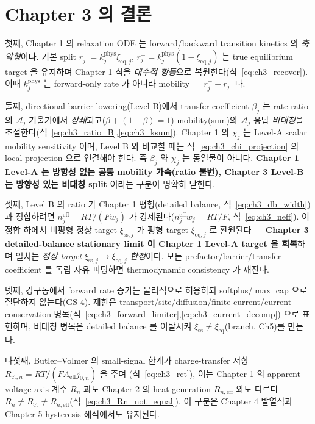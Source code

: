\documentclass[11pt,a4paper]{article}
\newcommand{\eff}{\mathrm{eff}}
\newcommand{\eq}{\mathrm{eq}}
\newcommand{\ct}{\mathrm{ct}}
\newcommand{\sstat}{\mathrm{ss}}
\begin{document}
\section{Chapter 3 의 결론}\label{sec:ch3_concl}
첫째, Chapter 1 의 relaxation ODE 는 forward/backward transition kinetics 의 \emph{축약형}이다. 기본 split
$r_j^+=k_j^{\mathrm{phys}}\xi_{\eq,j}$, $r_j^-=k_j^{\mathrm{phys}}(1-\xi_{\eq,j})$ 는 true equilibrium target 을
유지하며 Chapter 1 식을 \emph{대수적 항등}으로 복원한다(식~\eqref{eq:ch3_recover}). 이때 $k_j^{\mathrm{phys}}$ 는
forward-only rate 가 아니라 mobility $=r_j^++r_j^-$ 다.

둘째, directional barrier lowering(Level B)에서 transfer coefficient $\beta_j$ 는 rate ratio 의
$\mathcal A_j$-기울기에서 \emph{상쇄}되고($\beta+(1-\beta)=1$) mobility(sum)의 $\mathcal A_j$-응답 \emph{비대칭}을
조절한다(식~\eqref{eq:ch3_ratio_B},\allowbreak\eqref{eq:ch3_ksum}). Chapter 1 의 $\chi_j$ 는 Level-A scalar
mobility sensitivity 이며, Level B 와 비교할 때는 식~\eqref{eq:ch3_chi_projection} 의 local projection 으로
연결해야 한다. 즉 $\beta_j$ 와 $\chi_j$ 는 동일물이 아니다. \textbf{Chapter 1 Level-A 는 방향성 없는 공통 mobility
가속(ratio 불변), Chapter 3 Level-B 는 방향성 있는 비대칭 split} 이라는 구분이 명확히 닫힌다.

셋째, Level B 의 ratio 가 Chapter 1 평형(detailed balance, 식~\eqref{eq:ch3_db_width})과 정합하려면
$n_j^{\eff}=RT/(Fw_j)$ 가 강제된다($n_j^{\eff}w_j=RT/F$, 식~\eqref{eq:ch3_neff}). 이 정합 하에서 비평형 정상 target
$\xi_{\sstat,j}$ 가 평형 target $\xi_{\eq,j}$ 로 환원된다 — \textbf{Chapter 3 detailed-balance stationary limit 이
Chapter 1 Level-A target 을 회복}하며 일치는 \emph{정상 target} $\xi_{\sstat,j}\to\xi_{\eq,j}$ \emph{한정}이다.
모든
prefactor/barrier/transfer coefficient 를 독립 자유 피팅하면 thermodynamic consistency 가 깨진다.

넷째, 강구동에서 forward rate 증가는 물리적으로 허용하되 softplus/$\max$ cap 으로 절단하지 않는다(GS-4). 제한은
transport/site/diffusion/finite-current/current-conservation 병목(식~\eqref{eq:ch3_forward_limiter},\allowbreak\eqref{eq:ch3_current_decomp})
으로 표현하며, 비대칭 병목은 detailed balance 를 이탈시켜 $\xi_{\sstat}\ne\xi_{\eq}$(branch, Ch5)를 만든다.

다섯째, Butler--Volmer 의 small-signal 한계가 charge-transfer 저항 $R_{\ct,n}=RT/(FA_\eff j_{0,n})$ 을 주며
(식~\eqref{eq:ch3_rct}), 이는 Chapter 1 의 apparent voltage-axis 계수 $R_n$ 과도 Chapter 2 의 heat-generation
$R_{n,\eff}$ 와도 다르다 — \textbf{$R_n\ne R_\ct\ne R_{n,\eff}$}(식~\eqref{eq:ch3_Rn_not_equal}). 이 구분은
Chapter 4 발열식과 Chapter 5 hysteresis 해석에서도 유지된다.
\end{document}
